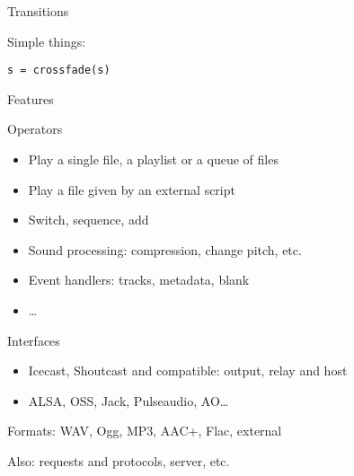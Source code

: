 \documentclass{beamer}
\newcommand{\kw}[1]{{\color{red} #1}}
\renewcommand{\textbf}[1]{{\color{blue} #1}}
\begin{document}
\begin{frame}[fragile]{Transitions}

 \begin{center}
\end{center}

\vfill
Simple things:
\begin{lstlisting}
s = crossfade(s)
\end{lstlisting}
\end{frame}


\begin{frame}{Features}

\begin{block}{Operators}
\begin{itemize}
\item Play a \kw{single} file, a \kw{playlist} or a queue of files
\item Play a file given by an external script
\item Switch, sequence, add
\item Sound processing: compression, change pitch, etc.
\item Event handlers: tracks, metadata, blank
\item \ldots
\end{itemize}
\end{block}

\begin{block}{Interfaces}
\begin{itemize}
\item Icecast, Shoutcast and compatible: output, relay and host
\item ALSA, OSS, Jack, Pulseaudio, AO\ldots
\end{itemize}
\end{block}

\textbf{Formats:} WAV, Ogg, MP3, AAC+, Flac, external

\textbf{Also}: requests and protocols, server, etc.

\end{frame}
\end{document}

